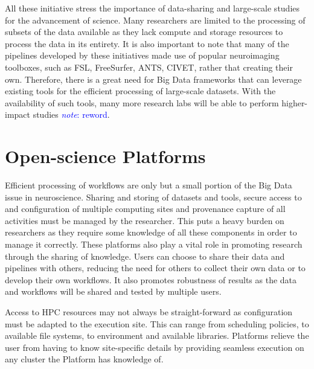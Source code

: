\documentclass{report}
\newcommand{\note}[1]{\textcolor{blue}{\textit{note}: #1}}
\begin{document}
            All these initiative stress the importance of data-sharing and
            large-scale studies for the advancement of science. Many researchers
            are limited to the processing of subsets of the data available as 
            they lack compute and storage resources to process the data in its
            entirety. It is also important to note that many of the pipelines 
            developed by these initiatives made use of popular neuroimaging 
            toolboxes, such as FSL, FreeSurfer, ANTS, CIVET, rather that
            creating their own. Therefore, there is a great need for Big Data
            frameworks that can leverage existing tools for the efficient 
            processing of large-scale datasets. With the availability of such 
            tools, many more research labs will be able to perform
            higher-impact studies \note{reword}.


        \section{Open-science Platforms}\label{platforms}
            Efficient processing of workflows are only but a small portion of 
            the Big Data issue in neuroscience. %
            Sharing and storing of datasets
            and tools, secure access to and configuration of multiple computing 
            sites and provenance capture of all activities must be managed by 
            the researcher. This puts a heavy burden on researchers as they 
            require some knowledge of all these components in order to manage it
            correctly. These platforms also play a vital role in promoting 
            research through the sharing of knowledge. Users can choose to share
            their data and pipelines with others, reducing the need for others 
            to collect their own data or to develop their own workflows. It 
            also promotes robustness of results as the data and workflows will 
            be shared and tested by multiple users.

            Access to HPC resources may not always be straight-forward as 
            configuration must be adapted to the execution site. This can 
            range from scheduling policies, to available file systems, to 
            environment and available libraries. Platforms relieve the user
            from having to know site-specific details by providing seamless
            execution on any cluster the Platform has knowledge of.
\end{document}
